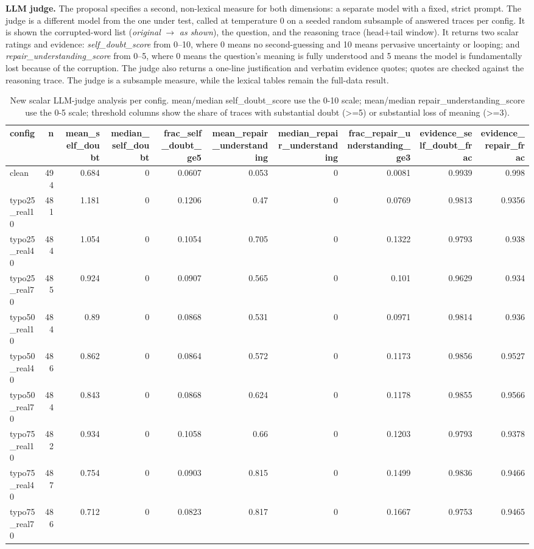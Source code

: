 \documentclass[11pt]{article}
\begin{document}
\noindent\textbf{LLM judge.} The proposal specifies a second,
non-lexical measure for both dimensions: a separate model with a fixed, strict prompt.
The judge is a different model from the one under test, called at temperature 0 on a
seeded random subsample of answered traces per config. It is shown the corrupted-word
list (\emph{original} $\to$ \emph{as shown}), the question, and the reasoning trace
(head+tail window). It returns two scalar ratings and evidence: \emph{self\_doubt\_score}
from 0--10, where 0 means no second-guessing and 10 means pervasive uncertainty or
looping; and \emph{repair\_understanding\_score} from 0--5, where 0 means the question's
meaning is fully understood and 5 means the model is fundamentally lost because of the
corruption. The judge also returns a one-line justification and verbatim evidence quotes;
quotes are checked against the reasoning trace. The judge is a subsample measure, while
the lexical tables remain the full-data result.
\medskip

\begin{table}[H]
\centering
\caption{New scalar LLM-judge analysis per config. mean/median self\_doubt\_score use the 0-10 scale; mean/median repair\_understanding\_score use the 0-5 scale; threshold columns show the share of traces with substantial doubt (>=5) or substantial loss of meaning (>=3).}
\small
\begin{adjustbox}{max width=\textwidth}
\begin{tabular}{lrrrrrrrrr}
\toprule
\textbf{config} & \textbf{n} & \textbf{mean\_self\_doubt} & \textbf{median\_self\_doubt} & \textbf{frac\_self\_doubt\_ge5} & \textbf{mean\_repair\_understanding} & \textbf{median\_repair\_understanding} & \textbf{frac\_repair\_understanding\_ge3} & \textbf{evidence\_self\_doubt\_frac} & \textbf{evidence\_repair\_frac} \\
\midrule
clean & 494 & 0.684 & 0 & 0.0607 & 0.053 & 0 & 0.0081 & 0.9939 & 0.998 \\
typo25\_real10 & 481 & 1.181 & 0 & 0.1206 & 0.47 & 0 & 0.0769 & 0.9813 & 0.9356 \\
typo25\_real40 & 484 & 1.054 & 0 & 0.1054 & 0.705 & 0 & 0.1322 & 0.9793 & 0.938 \\
typo25\_real70 & 485 & 0.924 & 0 & 0.0907 & 0.565 & 0 & 0.101 & 0.9629 & 0.934 \\
typo50\_real10 & 484 & 0.89 & 0 & 0.0868 & 0.531 & 0 & 0.0971 & 0.9814 & 0.936 \\
typo50\_real40 & 486 & 0.862 & 0 & 0.0864 & 0.572 & 0 & 0.1173 & 0.9856 & 0.9527 \\
typo50\_real70 & 484 & 0.843 & 0 & 0.0868 & 0.624 & 0 & 0.1178 & 0.9855 & 0.9566 \\
typo75\_real10 & 482 & 0.934 & 0 & 0.1058 & 0.66 & 0 & 0.1203 & 0.9793 & 0.9378 \\
typo75\_real40 & 487 & 0.754 & 0 & 0.0903 & 0.815 & 0 & 0.1499 & 0.9836 & 0.9466 \\
typo75\_real70 & 486 & 0.712 & 0 & 0.0823 & 0.817 & 0 & 0.1667 & 0.9753 & 0.9465 \\
\bottomrule
\end{tabular}
\end{adjustbox}
\end{table}
\end{document}
